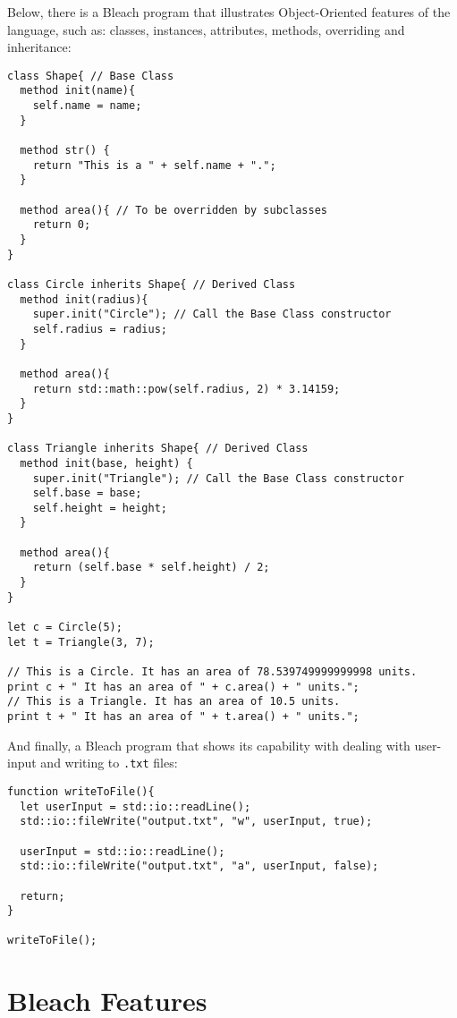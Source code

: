 Below, there is a Bleach program that illustrates Object-Oriented features of the language, such as: classes, instances, attributes, methods, overriding and inheritance: \newline
\begin{lstlisting}
class Shape{ // Base Class
  method init(name){
    self.name = name;
  }

  method str() {
    return "This is a " + self.name + ".";
  }

  method area(){ // To be overridden by subclasses
    return 0;
  }
}

class Circle inherits Shape{ // Derived Class
  method init(radius){
    super.init("Circle"); // Call the Base Class constructor
    self.radius = radius;
  }

  method area(){
    return std::math::pow(self.radius, 2) * 3.14159;
  }
}

class Triangle inherits Shape{ // Derived Class
  method init(base, height) {
    super.init("Triangle"); // Call the Base Class constructor
    self.base = base;
    self.height = height;
  }

  method area(){
    return (self.base * self.height) / 2;
  }
}

let c = Circle(5);
let t = Triangle(3, 7);

// This is a Circle. It has an area of 78.539749999999998 units.
print c + " It has an area of " + c.area() + " units.";
// This is a Triangle. It has an area of 10.5 units.
print t + " It has an area of " + t.area() + " units.";
\end{lstlisting}

And finally, a Bleach program that shows its capability with dealing with user-input and writing to \texttt{.txt} files: \newline
\begin{lstlisting}
function writeToFile(){
  let userInput = std::io::readLine();
  std::io::fileWrite("output.txt", "w", userInput, true);

  userInput = std::io::readLine();
  std::io::fileWrite("output.txt", "a", userInput, false);

  return;
}

writeToFile();
\end{lstlisting}


\section{Bleach Features}
